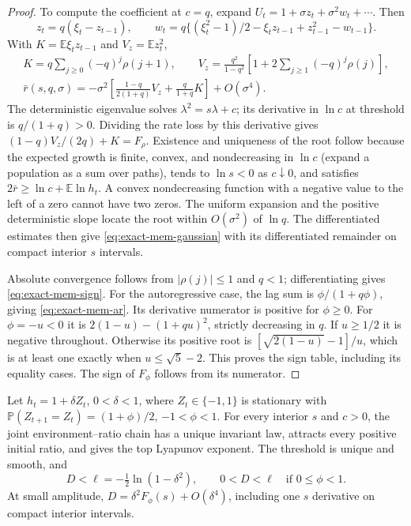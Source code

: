\begin{proof}
To compute the coefficient at $c=q$, expand
$U_t=1+\sigma z_t+\sigma^2 w_t+\cdots$. Then
\begin{equation}
 z_t=q(\xi_t-z_{t-1}),\qquad
 w_t=q\{(\xi_t^2-1)/2-\xi_tz_{t-1}+z_{t-1}^2-w_{t-1}\}.
 \label{eq:exact-mem-recursions}
\end{equation}
With $K=\mathbb E\xi_tz_{t-1}$ and $V_z=\mathbb Ez_t^2$,
\begin{equation}
\begin{gathered}
 K=q\sum_{j\geq0}(-q)^j\rho(j+1),\qquad
 V_z=\frac{q^2}{1-q^2}
       \left[1+2\sum_{j\geq1}(-q)^j\rho(j)\right],\\
 \bar r(s,q,\sigma)=-\sigma^2
 \left[\frac{1-q}{2(1+q)}V_z+\frac{q}{1+q}K\right]+O(\sigma^4).
 \label{eq:exact-mem-rate}
\end{gathered}
\end{equation}
The deterministic eigenvalue solves $\lambda^2=s\lambda+c$;
its derivative in $\ln c$ at threshold is $q/(1+q)>0$.
Dividing the rate loss by this derivative gives
$(1-q)V_z/(2q)+K=F_\rho$.
Existence and uniqueness of the root follow because the expected
growth is finite, convex, and nondecreasing in $\ln c$ (expand a
population as a sum over paths), tends to $\ln s<0$ as $c\downarrow0$,
and satisfies $2\bar r\geq\ln c+\mathbb E\ln h_t$.
A convex nondecreasing function with a negative value to the left of
a zero cannot have two zeros. The uniform expansion and the positive
deterministic slope locate the root within $O(\sigma^2)$ of $\ln q$.
The differentiated estimates then give \eqref{eq:exact-mem-gaussian}
with its differentiated remainder on compact interior $s$ intervals.

Absolute convergence follows from $|\rho(j)|\leq1$ and $q<1$;
differentiating gives \eqref{eq:exact-mem-sign}. For the autoregressive
case, the lag sum is $\phi/(1+q\phi)$, giving
\eqref{eq:exact-mem-ar}. Its derivative numerator is positive for
$\phi\geq0$. For $\phi=-u<0$ it is
$2(1-u)-(1+qu)^2$, strictly decreasing in $q$. If $u\geq1/2$ it is
negative throughout. Otherwise its positive root is
$[\sqrt{2(1-u)}-1]/u$, which is at least one exactly when
$u\leq\sqrt5-2$. This proves the sign table, including its equality
cases. The sign of $F_\phi$ follows from its numerator.
\end{proof}

\begin{proposition}
\label{prop:exact-mem-bounds}
Let $h_t=1+\delta Z_t$, $0<\delta<1$, where $Z_t\in\{-1,1\}$ is
stationary with $\mathbb P(Z_{t+1}=Z_t)=(1+\phi)/2$, $-1<\phi<1$.
For every interior $s$ and $c>0$, the joint environment--ratio chain
has a unique invariant law, attracts every positive initial ratio,
and gives the top Lyapunov exponent. The threshold is unique and smooth,
and
\begin{equation}
 D<\ell=-\tfrac12\ln(1-\delta^2),\qquad
 0<D<\ell\quad\text{if }0\leq\phi<1.
 \label{eq:exact-mem-bounds}
\end{equation}
At small amplitude, $D=\delta^2F_\phi(s)+O(\delta^4)$, including
one $s$ derivative on compact interior intervals.
\end{proposition}

